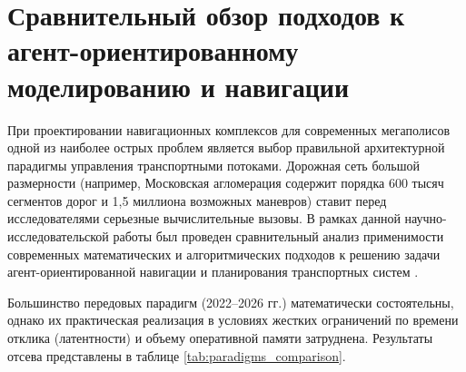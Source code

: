 \section{Сравнительный обзор подходов к агент-ориентированному моделированию и навигации}

При проектировании навигационных комплексов для современных мегаполисов одной из наиболее острых проблем является выбор правильной архитектурной парадигмы управления транспортными потоками. Дорожная сеть большой размерности (например, Московская агломерация содержит порядка 600 тысяч сегментов дорог и 1,5 миллиона возможных маневров) ставит перед исследователями серьезные вычислительные вызовы. В рамках данной научно-исследовательской работы был проведен сравнительный анализ применимости современных математических и алгоритмических подходов к решению задачи агент-ориентированной навигации и планирования транспортных систем \cite{yakimov2013planning, yakimov2022planning_visum}.

Большинство передовых парадигм (2022–2026 гг.) математически состоятельны, однако их практическая реализация в условиях жестких ограничений по времени отклика (латентности) и объему оперативной памяти затруднена. Результаты отсева представлены в таблице \ref{tab:paradigms_comparison}.

